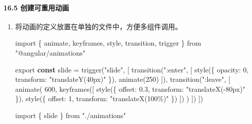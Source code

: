 \documentclass[
]{article}
\newenvironment{Shaded}{}{}
\newcommand{\DataTypeTok}[1]{\textcolor[rgb]{0.56,0.13,0.00}{#1}}
\newcommand{\DecValTok}[1]{\textcolor[rgb]{0.25,0.63,0.44}{#1}}
\newcommand{\FloatTok}[1]{\textcolor[rgb]{0.25,0.63,0.44}{#1}}
\newcommand{\FunctionTok}[1]{\textcolor[rgb]{0.02,0.16,0.49}{#1}}
\newcommand{\ImportTok}[1]{#1}
\newcommand{\KeywordTok}[1]{\textcolor[rgb]{0.00,0.44,0.13}{\textbf{#1}}}
\newcommand{\NormalTok}[1]{#1}
\newcommand{\OperatorTok}[1]{\textcolor[rgb]{0.40,0.40,0.40}{#1}}
\newcommand{\StringTok}[1]{\textcolor[rgb]{0.25,0.44,0.63}{#1}}
\begin{document}
\hypertarget{165-ux521bux5efaux53efux91cdux7528ux52a8ux753b}{%
\paragraph{16.5
创建可重用动画}\label{165-ux521bux5efaux53efux91cdux7528ux52a8ux753b}}

\begin{enumerate}
\def\labelenumi{\arabic{enumi}.}
\item
  将动画的定义放置在单独的文件中，方便多组件调用。

\begin{Shaded}
\begin{Highlighting}[]
\ImportTok{import}\NormalTok{ \{ animate}\OperatorTok{,}\NormalTok{ keyframes}\OperatorTok{,}\NormalTok{ style}\OperatorTok{,}\NormalTok{ transition}\OperatorTok{,}\NormalTok{ trigger \} }\ImportTok{from} \StringTok{"@angular/animations"}

\ImportTok{export} \KeywordTok{const}\NormalTok{ slide }\OperatorTok{=} \FunctionTok{trigger}\NormalTok{(}\StringTok{"slide"}\OperatorTok{,}\NormalTok{ [}
  \FunctionTok{transition}\NormalTok{(}\StringTok{":enter"}\OperatorTok{,}\NormalTok{ [}
    \FunctionTok{style}\NormalTok{(\{ }\DataTypeTok{opacity}\OperatorTok{:} \DecValTok{0}\OperatorTok{,} \DataTypeTok{transform}\OperatorTok{:} \StringTok{"translateY(40px)"}\NormalTok{ \})}\OperatorTok{,}
    \FunctionTok{animate}\NormalTok{(}\DecValTok{250}\NormalTok{)}
\NormalTok{  ])}\OperatorTok{,}
  \FunctionTok{transition}\NormalTok{(}\StringTok{":leave"}\OperatorTok{,}\NormalTok{ [}
    \FunctionTok{animate}\NormalTok{(}
      \DecValTok{600}\OperatorTok{,}
      \FunctionTok{keyframes}\NormalTok{([}
        \FunctionTok{style}\NormalTok{(\{ }\DataTypeTok{offset}\OperatorTok{:} \FloatTok{0.3}\OperatorTok{,} \DataTypeTok{transform}\OperatorTok{:} \StringTok{"translateX({-}80px)"}\NormalTok{ \})}\OperatorTok{,}
        \FunctionTok{style}\NormalTok{(\{ }\DataTypeTok{offset}\OperatorTok{:} \DecValTok{1}\OperatorTok{,} \DataTypeTok{transform}\OperatorTok{:} \StringTok{"translateX(100\%)"}\NormalTok{ \})}
\NormalTok{      ])}
\NormalTok{    )}
\NormalTok{  ])}
\NormalTok{])}
\end{Highlighting}
\end{Shaded}

\begin{Shaded}
\begin{Highlighting}[]
\ImportTok{import}\NormalTok{ \{ slide \} }\ImportTok{from} \StringTok{"./animations"}


\end{Highlighting}
\end{Shaded}
\end{enumerate}
\end{document}
